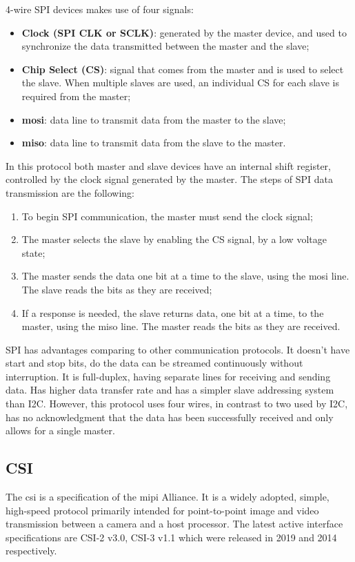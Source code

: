 4-wire SPI devices makes use of four signals:
\begin{itemize}
	\item \textbf{Clock (SPI CLK or SCLK)}: generated by the master device, and used to synchronize the data transmitted between the master and the slave;
	\item \textbf{Chip Select (CS)}: signal that comes from the master and is used to select the slave. When multiple slaves are used, an individual CS for each slave is required from the master;
	\item \textbf{\ac{mosi}}: data line to transmit data from the master to the slave;
	\item \textbf{\ac{miso}}: data line to transmit data from the slave to the master.
\end{itemize}

In this protocol both master and slave devices have an internal shift register, controlled by the clock signal generated by the master.
\clearpage
The steps of SPI data transmission are the following:

\begin{enumerate}
	\item To begin SPI communication, the master must send the clock signal;
	\item The master selects the slave by enabling the CS signal, by a low voltage state;
	\item The master sends the data one bit at a time to the slave, using the \ac{mosi} line. The slave reads the bits as they are received;
	\item If a response is needed, the slave returns data, one bit at a time, to the master, using the \ac{miso} line. The master reads the bits as they are received.
\end{enumerate}

SPI has advantages comparing to other communication protocols. It doesn't have start and stop bits, do the data can be streamed continuously without interruption. It is full-duplex, having separate lines for receiving and sending data. Has higher data transfer rate and has a simpler slave addressing system than I2C. However, this protocol uses four wires, in contrast to two used by I2C, has no acknowledgment that the data has been successfully received and only allows for a single master. \cite{spi_basics}

\clearpage
\subsection{CSI}
The \ac{csi} is a specification of the \ac{mipi} Alliance. It is a widely adopted, simple, high-speed protocol primarily intended for point-to-point image and video transmission between a camera and a host processor. The latest active interface specifications are CSI-2 v3.0, CSI-3 v1.1 which were released in 2019 and 2014 respectively. \cite{csi_basics}


